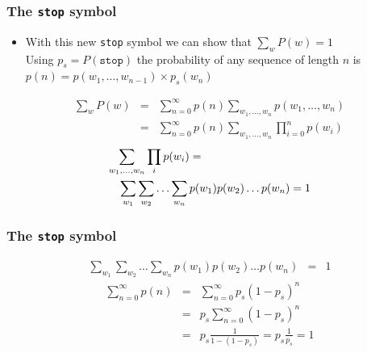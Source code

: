 \begin{frame}
\frametitle{The {\tt stop} symbol}
\begin{itemize}[<+->]
\item With this new {\tt stop} symbol we can show that $\sum_w P(w) = 1$ \\
Using $p_s = P(\texttt{stop})$ the probability of any sequence of length $n$ is $p(n) = p(w_1, \ldots, w_{n-1}) \times p_s(w_n)$ \\
\end{itemize}
\begin{eqnarray*}
\sum_w P(w) &=& \sum_{n=0}^{\infty} p(n) \sum_{w_1, \ldots, w_n} p(w_1, \ldots, w_n) \\
&=& \sum_{n=0}^{\infty} p(n) \sum_{w_1, \ldots, w_n} \prod_{i=0}^n p(w_i)
\end{eqnarray*}
\begin{eqnarray*}
\lefteqn{\sum_{w_1, \ldots, w_n} \prod_i p(w_i) = } \\
&& \sum_{w_1} \sum_{w_2} \ldots \sum_{w_n} p(w_1) p(w_2) \ldots p(w_n) = 1
\end{eqnarray*}
\end{frame}

\begin{frame}
\frametitle{The {\tt stop} symbol}
\begin{eqnarray*}
\sum_{w_1} \sum_{w_2} \ldots \sum_{w_n} p(w_1) p(w_2) \ldots p(w_n) &=& 1
\end{eqnarray*}
\begin{eqnarray*}
\sum_{n=0}^\infty p(n) &=& \sum_{n=0}^\infty p_s(1 - p_s)^n \\
&=& p_s \sum_{n=0}^\infty (1 - p_s)^n \\
&=& p_s \frac{1}{1-(1-p_s)} = p_s \frac{1}{p_s} = 1
\end{eqnarray*}
\end{frame}




 
